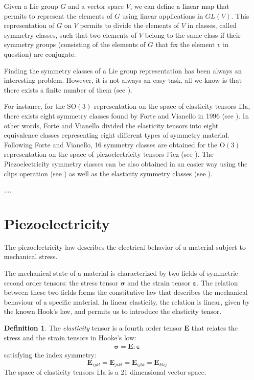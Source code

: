 \documentclass[11pt,a4paper]{amsart}
\theoremstyle{definition}
\newtheorem{defn}[thm]{Definition}
\newcommand{\Ela}{\mathbb{E}\mathrm{la}}    %
\newcommand{\Piez}{\mathbb{P}\mathrm{iez}}  %
\newcommand{\OO}{\mathrm{O}}                %
\newcommand{\SO}{\mathrm{SO}}               %
\newcommand{\1}{\mathds{1}}		            %
\newcommand{\bE}{\mathbf{E}}                %
\newcommand{\bsigma}{\mathbf{\sigma}}       %
\newcommand{\beps}{\mathbf{\varepsilon}}
\begin{document}
\par Given a Lie group $G$ and a vector space $V$, we can define a linear map that permits to represent the elements of $G$ using linear applications in $GL(V)$. This representation of $G$ on $V$ permits to divide the elements of $V$ in classes, called symmetry classes, such that two elements of $V$ belong to the same class if their symmetry groups (consisting of the elements of $G$ that fix the element $v$ in question)  are conjugate.
\par Finding the symmetry classes of a Lie group representation has been always an interesting problem. However, it is not always an easy task, all we know is that there exists a finite number of them (see \cite{Mostow1957}).
\par For instance, for the $\SO(3)$ representation on the space of elasticity tensors $\Ela$, there exists eight symmetry classes found by Forte and Vianello in 1996 (see \cite{forte1996}). In other words, Forte and Vianello divided the elasticity tensors into eight equivalence classes representing eight different types of symmetry material. Following Forte and Vianello, 16 symmetry classes are obtained for the $\OO(3)$ representation on the space of piezoelectricity tensors $\Piez$ (see \cite{weller2004}). The Piezoelectricity symmetry classes can be also obtained in an easier way using the clips operation (see \cite{olive2019}) as well as the elasticity symmetry classes (see \cite{olive2013}).
\par ....


\section{Piezoelectricity}\label{sec:piezoelectricity}
\par The piezoelectricity law describes the electrical behavior of a material subject to mechanical stress.

\par The mechanical state of a material is characterized by two fields of symmetric second order tensors: the stress tensor $\bsigma$ and the strain tensor $\beps$. The relation between these two fields forms the constitutive law that describes the mechanical behaviour of a specific material. In linear elasticity, the relation is linear, given by the known Hook's law, and permits us to introduce the elasticity tensor.

\begin{defn}
The \emph{elasticity} tensor is a fourth order tensor $\bE$ that relates the stress and the strain tensors in Hooke's low:
\begin{align*}
\bsigma=\bE:\beps
\end{align*}
satisfying the index symmetry:
\begin{equation*}
\bE_{ijkl}=\bE_{jikl}=\bE_{ijlk}=\bE_{klij}
\end{equation*}
The space of elasticity tensors $\Ela$ is a 21 dimensional vector space.
\end{defn}
\end{document}
